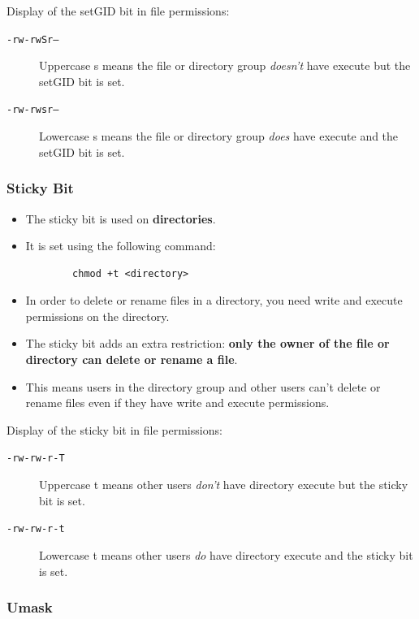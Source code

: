 \documentclass{article}
\newcommand{\code}[1]{\texttt{#1}}
\begin{document}
Display of the setGID bit in file permissions:

\begin{description}
    \item[\code{-rw-rwSr--}] Uppercase s means the file or directory group \emph{doesn't} have execute but the setGID bit is set.
    \item[\code{-rw-rwsr--}] Lowercase s means the file or directory group \emph{does} have execute and the setGID bit is set.
\end{description}

\subsubsection{Sticky Bit}

\begin{itemize}
    \item The sticky bit is used on \textbf{directories}.
    \item It is set using the following command:
    \begin{center}
        \begin{lstlisting}
        chmod +t <directory>
        \end{lstlisting}
    \end{center}
    \item In order to delete or rename files in a directory, you need write and execute permissions on the directory.
    \item The sticky bit adds an extra restriction: \textbf{only the owner of the file or directory can delete or rename a file}.
    \item This means users in the directory group and other users can't delete or rename files even if they have write and execute permissions.
\end{itemize}

Display of the sticky bit in file permissions:

\begin{description}
    \item[\code{-rw-rw-r-T}] Uppercase t means other users \emph{don't} have directory execute but the sticky bit is set.
    \item[\code{-rw-rw-r-t}] Lowercase t means other users \emph{do} have directory execute and the sticky bit is set.
\end{description}

\subsubsection{Umask}
\end{document}
